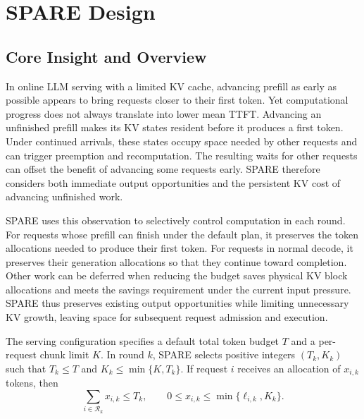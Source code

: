 \documentclass[sigconf,anonymous,review]{acmart}
\begin{document}

\section{SPARE Design}
\label{sec:spare-design}

\subsection{Core Insight and Overview}
\label{sec:spare-overview}

In online LLM serving with a limited KV cache, advancing prefill as early as possible appears to bring requests closer to their first token. Yet computational progress does not always translate into lower mean TTFT. Advancing an unfinished prefill makes its KV states resident before it produces a first token. Under continued arrivals, these states occupy space needed by other requests and can trigger preemption and recomputation. The resulting waits for other requests can offset the benefit of advancing some requests early. SPARE therefore considers both immediate output opportunities and the persistent KV cost of advancing unfinished work.

SPARE uses this observation to selectively control computation in each round. For requests whose prefill can finish under the default plan, it preserves the token allocations needed to produce their first token. For requests in normal decode, it preserves their generation allocations so that they continue toward completion. Other work can be deferred when reducing the budget saves physical KV block allocations and meets the savings requirement under the current input pressure. SPARE thus preserves existing output opportunities while limiting unnecessary KV growth, leaving space for subsequent request admission and execution.

The serving configuration specifies a default total token budget $T$ and a per-request chunk limit $K$. In round $k$, SPARE selects positive integers $(T_k,K_k)$ such that $T_k\le T$ and $K_k\le\min\{K,T_k\}$. If request $i$ receives an allocation of $x_{i,k}$ tokens, then
\begin{equation}
\sum_{i\in\mathcal R_k}x_{i,k}\le T_k,
\qquad 0\le x_{i,k}\le\min\{\ell_{i,k},K_k\}.
\tag{4}\label{eq:spare-budget}
\end{equation}
\end{document}
